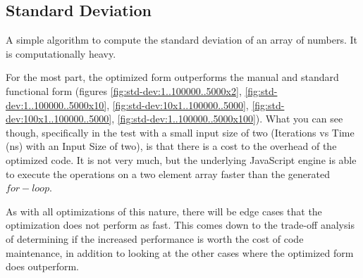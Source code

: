 \subsection{Standard Deviation}
A simple algorithm to compute the standard deviation of an array of numbers. It is computationally heavy.

For the most part, the optimized form outperforms the manual and standard functional form (figures \ref{fig:std-dev:1..100000..5000x2}, \ref{fig:std-dev:1..100000..5000x10}, \ref{fig:std-dev:10x1..100000..5000}, \ref{fig:std-dev:100x1..100000..5000}, \ref{fig:std-dev:1..100000..5000x100}).  What you can see though, specifically in the test with a small input size of two (Iterations vs Time (ns) with an Input Size of two), is that there is a cost to the overhead of the optimized code.  It is not very much, but the underlying JavaScript engine is able to execute the operations on a two element array faster than the generated $for-loop$.  

As with all optimizations of this nature, there will be edge cases that the optimization does not perform as fast.  This comes down to the trade-off analysis of determining if the increased performance is worth the cost of code maintenance, in addition to looking at the other cases where the optimized form does outperform.